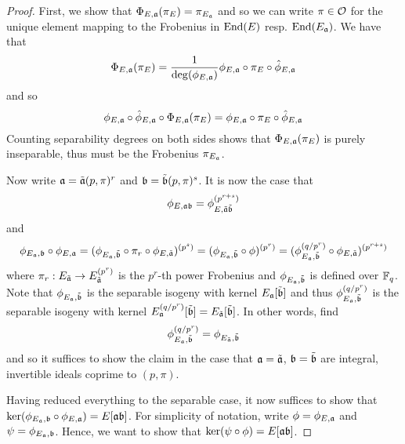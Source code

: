 \begin{proof}
    First, we show that $\Phi_{E, \mathfrak{a}}(\pi_E) = \pi_{E_{\mathfrak{a}}}$ and so we can write $\pi \in \mathcal{O}$ for the unique element mapping to the Frobenius in $\mathrm{End}(E)$ resp. $\mathrm{End}(E_{\mathfrak{a}})$.
    We have that
    \begin{equation*}
        \Phi_{E, \mathfrak{a}}(\pi_E) = \frac 1 {\deg(\phi_{E, \mathfrak{a}})} \phi_{E, \mathfrak{a}} \circ \pi_E \circ \hat{\phi}_{E, \mathfrak{a}}
    \end{equation*}
    and so
    \begin{equation*}
        \phi_{E, \mathfrak{a}} \circ \hat{\phi}_{E, \mathfrak{a}} \circ \Phi_{E, \mathfrak{a}}(\pi_E) = \phi_{E, \mathfrak{a}} \circ \pi_E \circ \hat{\phi}_{E, \mathfrak{a}}
    \end{equation*}
    Counting separability degrees on both sides shows that $\Phi_{E, \mathfrak{a}}(\pi_E)$ is purely inseparable, thus must be the Frobenius $\pi_{E_{\mathfrak{a}}}$.
    
    Now write $\mathfrak{a} = \tilde{\mathfrak{a}} (p, \pi)^r$ and $\mathfrak{b} = \tilde{\mathfrak{b}} (p, \pi)^s$.
    It is now the case that
    \begin{equation*}
        \phi_{E, \mathfrak{a}\mathfrak{b}} = \phi_{E, \tilde{\mathfrak{a}} \tilde{\mathfrak{b}}}^{(p^{r + s})}
    \end{equation*}
    and
    \begin{equation*}
        \phi_{E_{\mathfrak{a}}, \mathfrak{b}} \circ \phi_{E, \mathfrak{a}} = (\phi_{E_{\mathfrak{a}}, \tilde{\mathfrak{b}}} \circ \pi_r \circ \phi_{E, \tilde{\mathfrak{a}}})^{(p^s)} = (\phi_{E_{\mathfrak{a}}, \tilde{\mathfrak{b}}} \circ \phi)^{(p^r)} = (\phi_{E_{\mathfrak{a}}, \tilde{\mathfrak{b}}}^{(q/p^r)} \circ \phi_{E, \tilde{\mathfrak{a}}})^{(p^{r + s})}
    \end{equation*}
    where $\pi_r: E_{\tilde{\mathfrak{a}}} \to E_{\tilde{\mathfrak{a}}}^{(p^r)}$ is the $p^r$-th power Frobenius and $\phi_{E_{\mathfrak{a}}, \tilde{\mathfrak{b}}}$ is defined over $\mathbb{F}_q$.
    Note that $\phi_{E_{\mathfrak{a}}, \tilde{\mathfrak{b}}}$ is the separable isogeny with kernel $E_{\mathfrak{a}}[\tilde{\mathfrak{b}}]$ and thus $\phi_{E_{\mathfrak{a}}, \tilde{\mathfrak{b}}}^{(q/p^r)}$ is the separable isogeny with kernel $E_{\mathfrak{a}}^{(q/p^r)}[\tilde{\mathfrak{b}}] = E_{\tilde{\mathfrak{a}}}[\tilde{\mathfrak{b}}]$.
    In other words, find
    \begin{equation*}
        \phi_{E_{\mathfrak{a}}, \tilde{\mathfrak{b}}}^{(q/p^r)} = \phi_{E_{\tilde{\mathfrak{a}}}, \tilde{\mathfrak{b}}}
    \end{equation*}
    and so it suffices to show the claim in the case that $\mathfrak{a} = \tilde{\mathfrak{a}}$, $\mathfrak{b} = \tilde{\mathfrak{b}}$ are integral, invertible ideals coprime to $(p, \pi)$.

    Having reduced everything to the separable case, it now suffices to show that $\ker(\phi_{E_{\mathfrak{a}}, \mathfrak{b}} \circ \phi_{E, \mathfrak{a}}) = E[\mathfrak{a}\mathfrak{b}]$.
    For simplicity of notation, write $\phi = \phi_{E, \mathfrak{a}}$ and $\psi = \phi_{E_{\mathfrak{a}}, \mathfrak{b}}$.
    Hence, we want to show that $\ker(\psi \circ \phi) = E[\mathfrak{a}\mathfrak{b}]$.


\end{proof}
